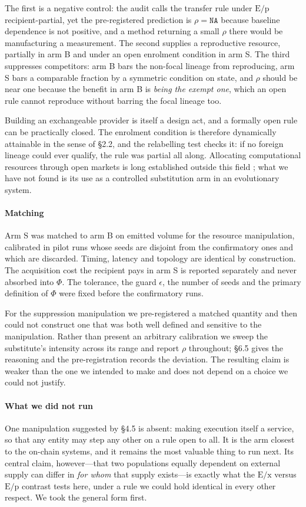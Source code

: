 \documentclass[review,3p,times]{elsarticle}
\begin{document}
The first is a negative control: the audit calls the transfer rule under
$\mathrm{E/p}$ recipient-partial, yet the pre-registered prediction is
$\rho=\texttt{NA}$ because baseline dependence is not positive, and a method
returning a small $\rho$ there would be manufacturing a measurement. The
second supplies a reproductive resource, partially in arm B and under an open
enrolment condition in arm S. The third suppresses competitors: arm B bars the
non-focal lineage from reproducing, arm S bars a comparable fraction by a
symmetric condition on state, and $\rho$ should be near one because the
benefit in arm B is \emph{being the exempt one}, which an open rule cannot
reproduce without barring the focal lineage too.

Building an exchangeable provider is itself a design act, and a formally open
rule can be practically closed. The enrolment condition is therefore
dynamically attainable in the sense of \S2.2, and the relabelling test checks
it: if no foreign lineage could ever qualify, the rule was partial all along.
Allocating computational resources through open markets is long established
outside this field \citep{sutherland1968,miller1988,waldspurger1992}; what we
have not found is its use as a controlled substitution arm in an evolutionary
system.

\paragraph{Matching}
Arm S was matched to arm B on emitted volume for the resource manipulation,
calibrated in pilot runs whose seeds are disjoint from the confirmatory ones
and which are discarded. Timing, latency and topology are identical by
construction. The acquisition cost the recipient pays in arm S is reported
separately and never absorbed into $\Phi$. The tolerance, the guard $\epsilon$,
the number of seeds and the primary definition of $\Phi$ were fixed before the
confirmatory runs.

For the suppression manipulation we pre-registered a matched quantity and then
could not construct one that was both well defined and sensitive to the
manipulation. Rather than present an arbitrary calibration we sweep the
substitute's intensity across its range and report $\rho$ throughout; \S6.5
gives the reasoning and the pre-registration records the deviation. The
resulting claim is weaker than the one we intended to make and does not depend
on a choice we could not justify.

\paragraph{What we did not run}
One manipulation suggested by \S4.5 is absent: making execution itself a
service, so that any entity may step any other on a rule open to all. It is the
arm closest to the on-chain systems, and it remains the most valuable thing to
run next. Its central claim, however---that two populations equally dependent
on external supply can differ in \emph{for whom} that supply exists---is
exactly what the $\mathrm{E/x}$ versus $\mathrm{E/p}$ contrast tests here,
under a rule we could hold identical in every other respect. We took the
general form first.
\end{document}
